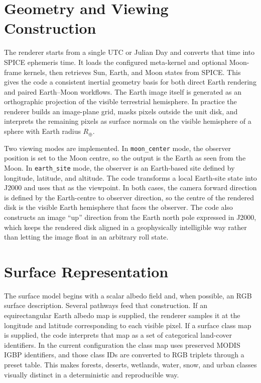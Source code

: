 \documentclass[12pt,a4paper]{article}
\begin{document}
\section{Geometry and Viewing Construction}
The renderer starts from a single UTC or Julian Day and converts that time into SPICE ephemeris time. It loads the configured meta-kernel and optional Moon-frame kernels, then retrieves Sun, Earth, and Moon states from SPICE. This gives the code a consistent inertial geometry basis for both direct Earth rendering and paired Earth--Moon workflows. The Earth image itself is generated as an orthographic projection of the visible terrestrial hemisphere. In practice the renderer builds an image-plane grid, masks pixels outside the unit disk, and interprets the remaining pixels as surface normals on the visible hemisphere of a sphere with Earth radius \(R_{\oplus}\).

Two viewing modes are implemented. In \texttt{moon\_center} mode, the observer position is set to the Moon centre, so the output is the Earth as seen from the Moon. In \texttt{earth\_site} mode, the observer is an Earth-based site defined by longitude, latitude, and altitude. The code transforms a local Earth-site state into J2000 and uses that as the viewpoint. In both cases, the camera forward direction is defined by the Earth-centre to observer direction, so the centre of the rendered disk is the visible Earth hemisphere that faces the observer. The code also constructs an image ``up'' direction from the Earth north pole expressed in J2000, which keeps the rendered disk aligned in a geophysically intelligible way rather than letting the image float in an arbitrary roll state.

\section{Surface Representation}
The surface model begins with a scalar albedo field and, when possible, an RGB surface description. Several pathways feed that construction. If an equirectangular Earth albedo map is supplied, the renderer samples it at the longitude and latitude corresponding to each visible pixel. If a surface class map is supplied, the code interprets that map as a set of categorical land-cover identifiers. In the current configuration the class map uses preserved MODIS IGBP identifiers, and those class IDs are converted to RGB triplets through a preset table. This makes forests, deserts, wetlands, water, snow, and urban classes visually distinct in a deterministic and reproducible way.
\end{document}
